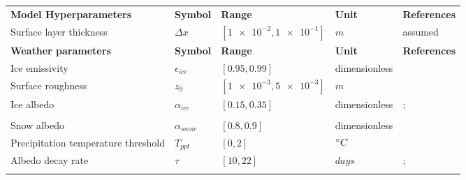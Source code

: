 \documentclass[tc, manuscript]{copernicus}
\begin{document}
\begin{table}
\begin{tabular}{lllll}
		\textbf{Model Hyperparameters} & \textbf{Symbol} & \textbf{Range} & \textbf{Unit} & \textbf{References} \\
    Surface layer thickness             & $\Delta x$            & $[\num{1e-2},\num{1e-1}]$           & $m$ & assumed
    \\\midrule
		\textbf{Weather parameters} & \textbf{Symbol} & \textbf{Range} & \textbf{Unit} & \textbf{References} \\
    Ice emissivity                      & $\epsilon_{ice}$      & $[0.95,0.99]$         & dimensionless & \citet{horiInsituMeasuredSpectral2006}             \\
    Surface roughness                   & $z_0$                 & $[\num{1e-3},\num{5e-3}]$            & $m$  & \citet{brockMeasurementParameterizationAerodynamic2006}       \\
    Ice albedo                          & $\alpha_{ice}$        & $[0.15,0.35]$         & dimensionless  &
    \citet{steinerModellingIcecliffBackwasting2015};            \\
    & &    &  & \citet{zollesRobustUncertaintyAssessment2019}      \\
    Snow albedo                         & $\alpha_{snow}$       & $[0.8,0.9]$        & dimensionless  & \citet{zollesRobustUncertaintyAssessment2019}              \\
    Precipitation temperature threshold & $T_{ppt}$             & $[0,2]$            & $^{\circ} C$& \citet{shichangResponseZhadangGlacier2010}  \\
    Albedo decay rate                   & $\tau$                & $[10,22]$           & $days$ &
    \citet{schmidtImportanceAccurateGlacier2017};      \\
    & &    &  & \citet{oerlemansYearRecordGlobal1998}      \\\midrule
	\end{tabular}
\end{table}
\clearpage


\noappendix 


\end{document}
